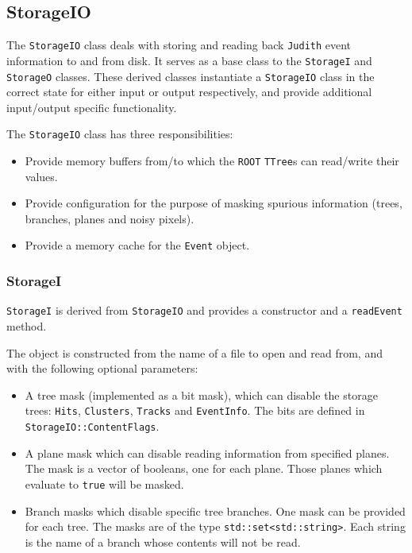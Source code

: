 \documentclass[10pt,a4paper]{book}
\newcommand{\ROOT}{\Verb`ROOT` }
\newcommand{\Judith}{\Verb`Judith` }
\begin{document}
\subsection{StorageIO}

The \Verb`StorageIO` class deals with storing and reading back \Judith event information to and from disk. It serves as a base class to the \Verb`StorageI` and \Verb`StorageO` classes. These derived classes instantiate a \Verb`StorageIO` class in the correct state for either input or output respectively, and provide additional input/output specific functionality.

The \Verb`StorageIO` class has three responsibilities:

\begin{itemize}
  \item Provide memory buffers from/to which the \ROOT \Verb`TTree`s can read/write their values.
  \item Provide configuration for the purpose of masking spurious information (trees, branches, planes and noisy pixels).
  \item Provide a memory cache for the \Verb`Event` object.
\end{itemize}

\subsubsection{StorageI}

\Verb`StorageI` is derived from \Verb`StorageIO` and provides a constructor and a \Verb`readEvent` method.

The object is constructed from the name of a file to open and read from, and with the following optional parameters:

\begin{itemize}
  \item A tree mask (implemented as a bit mask), which can disable the storage trees: \Verb`Hits`, \Verb`Clusters`, \Verb`Tracks` and \Verb`EventInfo`. The bits are defined in \Verb`StorageIO::ContentFlags`.
  \item A plane mask which can disable reading information from specified planes. The mask is a vector of booleans, one for each plane. Those planes which evaluate to \Verb`true` will be masked.
  \item Branch masks which disable specific tree branches. One mask can be provided for each tree. The masks are of the type \Verb`std::set<std::string>`. Each string is the name of a branch whose contents will not be read.
\end{itemize}
\end{document}
